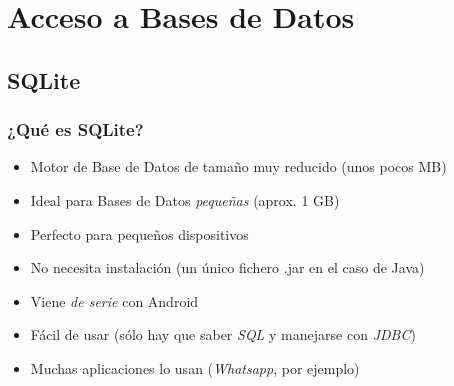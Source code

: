 \documentclass[xcolor={dvipsnames}]{beamer}
\begin{document}
\section{Acceso a Bases de Datos}
\subsection{SQLite}
\begin{frame}\frametitle{¿Qué es SQLite?}
    \begin{itemize}
        \item Motor de Base de Datos de tamaño muy reducido (unos pocos MB)
        \item Ideal para Bases de Datos \emph{pequeñas} (aprox. 1 GB)
        \item Perfecto para pequeños dispositivos
        \item No necesita instalación (un único fichero .jar en el caso de Java)
        \item Viene \emph{de serie} con Android
        \item Fácil de usar (sólo hay que saber \emph{SQL} y manejarse con \emph{JDBC})
        \item Muchas aplicaciones lo usan (\emph{Whatsapp}, por ejemplo)
    \end{itemize}
\end{frame}
\end{document}
